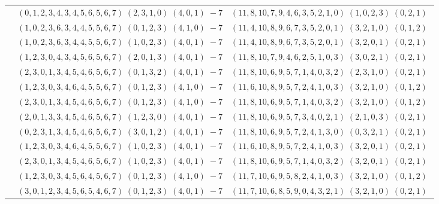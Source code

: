 \documentclass[11pt]{article}
\begin{document}
\begin{longtable}[l]{|c|c|c|}
 \cline{2-3} 
 & $(0 ,1 ,2 ,3 ,4 ,3 ,4 ,5 ,6 ,5 ,6 ,7) \;(2 ,3 ,1 ,0) \;(4 ,0 ,1) \;-7$ & $(11 ,8 ,10 ,7 ,9 ,4 ,6 ,3 ,5 ,2 ,1 ,0) \;(1 ,0 ,2 ,3) \;(0 ,2 ,1) \;$\\ 
 \cline{2-3} 
 & $(1 ,0 ,2 ,3 ,6 ,3 ,4 ,4 ,5 ,5 ,6 ,7) \;(0 ,1 ,2 ,3) \;(4 ,1 ,0) \;-7$ & $(11 ,4 ,10 ,8 ,9 ,6 ,7 ,3 ,5 ,2 ,0 ,1) \;(3 ,2 ,1 ,0) \;(0 ,1 ,2) \;$\\ 
 \cline{2-3} 
 & $(1 ,0 ,2 ,3 ,6 ,3 ,4 ,4 ,5 ,5 ,6 ,7) \;(1 ,0 ,2 ,3) \;(4 ,0 ,1) \;-7$ & $(11 ,4 ,10 ,8 ,9 ,6 ,7 ,3 ,5 ,2 ,0 ,1) \;(3 ,2 ,0 ,1) \;(0 ,2 ,1) \;$\\ 
 \cline{2-3} 
 & $(1 ,2 ,3 ,0 ,4 ,3 ,4 ,5 ,6 ,5 ,6 ,7) \;(2 ,0 ,1 ,3) \;(4 ,0 ,1) \;-7$ & $(11 ,8 ,10 ,7 ,9 ,4 ,6 ,2 ,5 ,1 ,0 ,3) \;(3 ,0 ,2 ,1) \;(0 ,2 ,1) \;$\\ 
 \cline{2-3} 
 & $(2 ,3 ,0 ,1 ,3 ,4 ,5 ,4 ,6 ,5 ,6 ,7) \;(0 ,1 ,3 ,2) \;(4 ,0 ,1) \;-7$ & $(11 ,8 ,10 ,6 ,9 ,5 ,7 ,1 ,4 ,0 ,3 ,2) \;(2 ,3 ,1 ,0) \;(0 ,2 ,1) \;$\\ 
 \cline{2-3} 
 & $(1 ,2 ,3 ,0 ,3 ,4 ,6 ,4 ,5 ,5 ,6 ,7) \;(0 ,1 ,2 ,3) \;(4 ,1 ,0) \;-7$ & $(11 ,6 ,10 ,8 ,9 ,5 ,7 ,2 ,4 ,1 ,0 ,3) \;(3 ,2 ,1 ,0) \;(0 ,1 ,2) \;$\\ 
 \cline{2-3} 
 & $(2 ,3 ,0 ,1 ,3 ,4 ,5 ,4 ,6 ,5 ,6 ,7) \;(0 ,1 ,2 ,3) \;(4 ,1 ,0) \;-7$ & $(11 ,8 ,10 ,6 ,9 ,5 ,7 ,1 ,4 ,0 ,3 ,2) \;(3 ,2 ,1 ,0) \;(0 ,1 ,2) \;$\\ 
 \cline{2-3} 
 & $(2 ,0 ,1 ,3 ,3 ,4 ,5 ,4 ,6 ,5 ,6 ,7) \;(1 ,2 ,3 ,0) \;(4 ,0 ,1) \;-7$ & $(11 ,8 ,10 ,6 ,9 ,5 ,7 ,3 ,4 ,0 ,2 ,1) \;(2 ,1 ,0 ,3) \;(0 ,2 ,1) \;$\\ 
 \cline{2-3} 
 & $(0 ,2 ,3 ,1 ,3 ,4 ,5 ,4 ,6 ,5 ,6 ,7) \;(3 ,0 ,1 ,2) \;(4 ,0 ,1) \;-7$ & $(11 ,8 ,10 ,6 ,9 ,5 ,7 ,2 ,4 ,1 ,3 ,0) \;(0 ,3 ,2 ,1) \;(0 ,2 ,1) \;$\\ 
 \cline{2-3} 
 & $(1 ,2 ,3 ,0 ,3 ,4 ,6 ,4 ,5 ,5 ,6 ,7) \;(1 ,0 ,2 ,3) \;(4 ,0 ,1) \;-7$ & $(11 ,6 ,10 ,8 ,9 ,5 ,7 ,2 ,4 ,1 ,0 ,3) \;(3 ,2 ,0 ,1) \;(0 ,2 ,1) \;$\\ 
 \cline{2-3} 
 & $(2 ,3 ,0 ,1 ,3 ,4 ,5 ,4 ,6 ,5 ,6 ,7) \;(1 ,0 ,2 ,3) \;(4 ,0 ,1) \;-7$ & $(11 ,8 ,10 ,6 ,9 ,5 ,7 ,1 ,4 ,0 ,3 ,2) \;(3 ,2 ,0 ,1) \;(0 ,2 ,1) \;$\\ 
 \cline{2-3} 
 & $(1 ,2 ,3 ,0 ,3 ,4 ,5 ,6 ,4 ,5 ,6 ,7) \;(0 ,1 ,2 ,3) \;(4 ,1 ,0) \;-7$ & $(11 ,7 ,10 ,6 ,9 ,5 ,8 ,2 ,4 ,1 ,0 ,3) \;(3 ,2 ,1 ,0) \;(0 ,1 ,2) \;$\\ 
 \cline{2-3} 
 & $(3 ,0 ,1 ,2 ,3 ,4 ,5 ,6 ,5 ,4 ,6 ,7) \;(0 ,1 ,2 ,3) \;(4 ,0 ,1) \;-7$ & $(11 ,7 ,10 ,6 ,8 ,5 ,9 ,0 ,4 ,3 ,2 ,1) \;(3 ,2 ,1 ,0) \;(0 ,2 ,1) \;$\\ 

\end{longtable}
\end{document}
